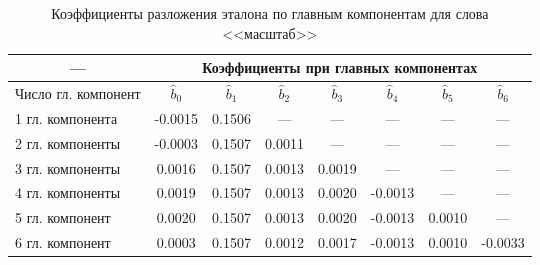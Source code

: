\begin{table}[h]
	\centering
	\caption{Коэффициенты разложения эталона по главным компонентам для слова <<масштаб>>}
	\label{tab:regressionCoefficientsScale}
	\begin{tabular}{| l | c | c | c | c | c | c | c |}
		\hline
		\multicolumn{1}{|c|}{---} & \multicolumn{7}{c|}{Коэффициенты при главных компонентах} \\
		\hline
		Число гл. компонент & $\widehat{b}_0$ & $\widehat{b}_1$ & $\widehat{b}_2$ & $\widehat{b}_3$ & $\widehat{b}_4$ & $\widehat{b}_5$ & $\widehat{b}_6$ \\
		\hline
		1 гл. компонента & -0.0015 & 0.1506 & \multicolumn{1}{c|}{---} & \multicolumn{1}{c|}{---} & \multicolumn{1}{c|}{---} & \multicolumn{1}{c|}{---} & \multicolumn{1}{c|}{---} \\
		2 гл. компоненты & -0.0003 & 0.1507 & 0.0011 & \multicolumn{1}{c|}{---} & \multicolumn{1}{c|}{---} & \multicolumn{1}{c|}{---} & \multicolumn{1}{c|}{---} \\
		3 гл. компоненты &  0.0016 & 0.1507 & 0.0013 & 0.0019 & \multicolumn{1}{c|}{---} & \multicolumn{1}{c|}{---} & \multicolumn{1}{c|}{---} \\
		4 гл. компоненты &  0.0019 & 0.1507 & 0.0013 & 0.0020 & -0.0013 & \multicolumn{1}{c|}{---} & \multicolumn{1}{c|}{---} \\
		5 гл. компонент  &  0.0020 & 0.1507 & 0.0013 & 0.0020 & -0.0013 & 0.0010 & \multicolumn{1}{c|}{---} \\
		6 гл. компонент  &  0.0003 & 0.1507 & 0.0012 & 0.0017 & -0.0013 & 0.0010 & -0.0033 \\
		\hline
	\end{tabular}
\end{table}

